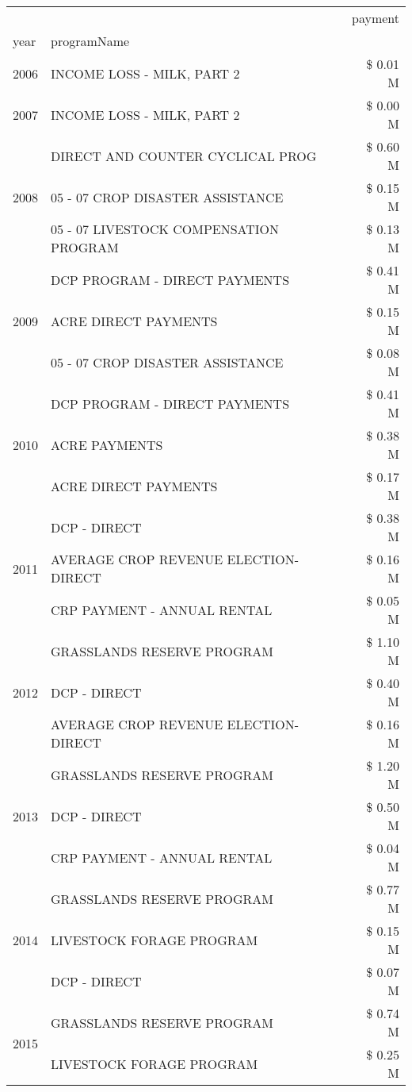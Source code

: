 \begin{tabular}{llr}
\toprule
 &  & payment \\
year & programName &  \\
\midrule
2006 & INCOME LOSS - MILK, PART 2 & \$ 0.01 M \\
\cline{1-3}
2007 & INCOME LOSS - MILK, PART 2 & \$ 0.00 M \\
\cline{1-3}
\multirow[t]{3}{*}{2008} & DIRECT AND COUNTER CYCLICAL PROG & \$ 0.60 M \\
 & 05 - 07 CROP DISASTER ASSISTANCE & \$ 0.15 M \\
 & 05 - 07 LIVESTOCK COMPENSATION PROGRAM & \$ 0.13 M \\
\cline{1-3}
\multirow[t]{3}{*}{2009} & DCP PROGRAM - DIRECT PAYMENTS & \$ 0.41 M \\
 & ACRE DIRECT PAYMENTS & \$ 0.15 M \\
 & 05 - 07 CROP DISASTER ASSISTANCE & \$ 0.08 M \\
\cline{1-3}
\multirow[t]{3}{*}{2010} & DCP PROGRAM - DIRECT PAYMENTS & \$ 0.41 M \\
 & ACRE PAYMENTS & \$ 0.38 M \\
 & ACRE DIRECT PAYMENTS & \$ 0.17 M \\
\cline{1-3}
\multirow[t]{3}{*}{2011} & DCP - DIRECT & \$ 0.38 M \\
 & AVERAGE CROP REVENUE ELECTION-DIRECT & \$ 0.16 M \\
 & CRP PAYMENT - ANNUAL RENTAL & \$ 0.05 M \\
\cline{1-3}
\multirow[t]{3}{*}{2012} & GRASSLANDS RESERVE PROGRAM & \$ 1.10 M \\
 & DCP - DIRECT & \$ 0.40 M \\
 & AVERAGE CROP REVENUE ELECTION-DIRECT & \$ 0.16 M \\
\cline{1-3}
\multirow[t]{3}{*}{2013} & GRASSLANDS RESERVE PROGRAM & \$ 1.20 M \\
 & DCP - DIRECT & \$ 0.50 M \\
 & CRP PAYMENT - ANNUAL RENTAL & \$ 0.04 M \\
\cline{1-3}
\multirow[t]{3}{*}{2014} & GRASSLANDS RESERVE PROGRAM & \$ 0.77 M \\
 & LIVESTOCK FORAGE PROGRAM & \$ 0.15 M \\
 & DCP - DIRECT & \$ 0.07 M \\
\cline{1-3}
\multirow[t]{3}{*}{2015} & GRASSLANDS RESERVE PROGRAM & \$ 0.74 M \\
 & LIVESTOCK FORAGE PROGRAM & \$ 0.25 M \\

\end{tabular}
